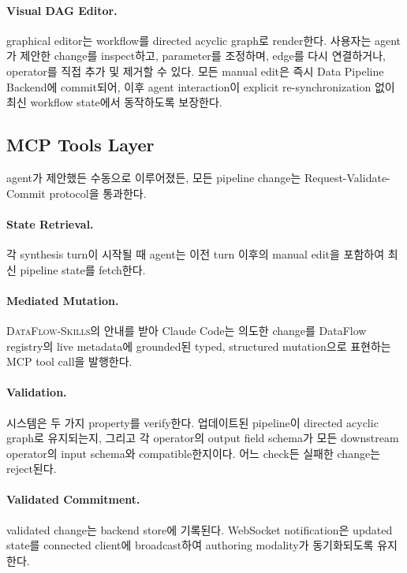 \paragraph{\textbf{Visual DAG Editor.}} graphical editor는 workflow를 directed acyclic graph로 render한다. 사용자는 agent가 제안한 change를 inspect하고, parameter를 조정하며, edge를 다시 연결하거나, operator를 직접 추가 및 제거할 수 있다. 모든 manual edit은 즉시 Data Pipeline Backend에 commit되어, 이후 agent interaction이 explicit re-synchronization 없이 최신 workflow state에서 동작하도록 보장한다.

\subsection{MCP Tools Layer}

agent가 제안했든 수동으로 이루어졌든, 모든 pipeline change는 Request-Validate-Commit protocol을 통과한다.

\paragraph{\textbf{State Retrieval.}} 각 synthesis turn이 시작될 때 agent는 이전 turn 이후의 manual edit을 포함하여 최신 pipeline state를 fetch한다.

\paragraph{\textbf{Mediated Mutation.}} \textsc{DataFlow-Skills}의 안내를 받아 Claude Code는 의도한 change를 DataFlow registry의 live metadata에 grounded된 typed, structured mutation으로 표현하는 MCP tool call을 발행한다.

\paragraph{\textbf{Validation.}} 시스템은 두 가지 property를 verify한다. 업데이트된 pipeline이 directed acyclic graph로 유지되는지, 그리고 각 operator의 output field schema가 모든 downstream operator의 input schema와 compatible한지이다. 어느 check든 실패한 change는 reject된다.

\paragraph{\textbf{Validated Commitment.}} validated change는 backend store에 기록된다. WebSocket notification은 updated state를 connected client에 broadcast하여 authoring modality가 동기화되도록 유지한다.

